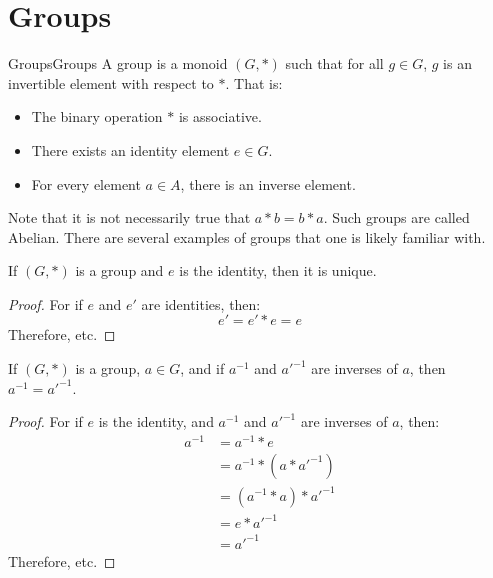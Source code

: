 \section{Groups}
    \begin{fdefinition}{Groups}{Groups}
        A group is a \gls{monoid} $(G,*)$ such that for all $g\in{G}$, $g$ is an
        \gls{invertible element} with respect to $*$. That is:
        \begin{itemize}
            \item The binary operation $*$ is associative.
            \item There exists an identity element $e\in{G}$.
            \item For every element $a\in{A}$, there is an inverse element.
        \end{itemize}
    \end{fdefinition}
    Note that it is not necessarily true that $a*b=b*a$. Such groups are called
    Abelian. There are several examples of groups that one is likely familiar
    with.
    \begin{theorem}
        If $(G,*)$ is a group and $e$ is the identity, then it is unique.
    \end{theorem}
    \begin{proof}
        For if $e$ and $e'$ are identities, then:
        \begin{equation}
            e'=e'*e=e
        \end{equation}
        Therefore, etc.
    \end{proof}
    \begin{theorem}
        \label{thm:Group_Theory_Inverses_Are_Unique}
        If $(G,*)$ is a group, $a\in{G}$, and if $a^{-1}$ and
        $a'^{-1}$ are inverses of $a$, then $a^{-1}=a'^{-1}$.
    \end{theorem}
    \begin{proof}
        For if $e$ is the identity, and
        $a^{-1}$ and $a'^{-1}$ are inverses of $a$, then:
        \begin{align}
            a^{-1}&=a^{-1}*e
            \tag{Identitive Property}\\
            &=a^{-1}*(a*a'^{-1})
            \tag{Inverse Property}\\
            &=(a^{-1}*a)*a'^{-1}
            \tag{Associative Property}\\
            &=e*a'^{-1}
            \tag{Inverse Property}\\
            &=a'^{-1}
            \tag{Identitive Property}
        \end{align}
        Therefore, etc.
    \end{proof}
